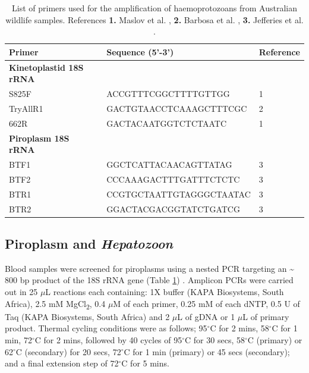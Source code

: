 \documentclass[a4paper, nobind]{templates/ociamthesis}
\begin{document}
\begin{table}

\caption[Primers used for haemoprotozoa detection in samples from ticks and wildlife.]{\label{tab:T4primers}List of primers used for the amplification of haemoprotozoans from Australian wildlife samples. References \textbf{1.} Maslov et al. \autocite*{maslovPhylogenyTrypanosomesInferred1996}, \textbf{2.} Barbosa et al. \autocite*{barbosaIncreasedGeneticDiversity2017}, \textbf{3.} Jefferies et al. \autocite*{jefferiesPCRRFLPDetectionDifferentiation2007}.}
\centering
\fontsize{8.5}{10.5}\selectfont
\begin{tabular}[t]{lll}
\toprule
Primer & Sequence (5'-3') & Reference\\
\midrule
\textbf{Kinetoplastid 18S rRNA} & \textbf{} & \textbf{}\\
S825F & ACCGTTTCGGCTTTTGTTGG & 1\\
TryAllR1 & GACTGTAACCTCAAAGCTTTCGC & 2\\
662R & GACTACAATGGTCTCTAATC & 1\\
\textbf{Piroplasm 18S rRNA} & \textbf{} & \textbf{}\\
BTF1 & GGCTCATTACAACAGTTATAG & 3\\
BTF2 & CCCAAAGACTTTGATTTCTCTC & 3\\
BTR1 & CCGTGCTAATTGTAGGGCTAATAC & 3\\
BTR2 & GGACTACGACGGTATCTGATCG & 3\\
\bottomrule
\end{tabular}
\end{table}

\hypertarget{piroplasm-and-hepatozoon}{%
\subsection{\texorpdfstring{Piroplasm and \emph{Hepatozoon}}{Piroplasm and Hepatozoon}}\label{piroplasm-and-hepatozoon}}

Blood samples were screened for piroplasms using a nested PCR targeting an \textasciitilde{} 800 bp product of the 18S rRNA gene (Table \ref{tab:T4primers}) \autocite{jefferiesPCRRFLPDetectionDifferentiation2007}.
Amplicon PCRs were carried out in 25 \(\mu\)L reactions each containing: 1X buffer (KAPA Biosystems, South Africa), 2.5 mM MgCl\textsubscript{2}, 0.4 \(\mu\)M of each primer, 0.25 mM of each dNTP, 0.5 U of Taq (KAPA Biosystems, South Africa) and 2 \(\mu\)L of gDNA or 1 \(\mu\)L of primary product.
Thermal cycling conditions were as follows; 95\(^\circ\)C for 2 mins, 58\(^\circ\)C for 1 min, 72\(^\circ\)C for 2 mins, followed by 40 cycles of 95\(^\circ\)C for 30 secs, 58\(^\circ\)C (primary) or 62\(^\circ\)C (secondary) for 20 secs, 72\(^\circ\)C for 1 min (primary) or 45 secs (secondary); and a final extension step of 72\(^\circ\)C for 5 mins.
\end{document}
